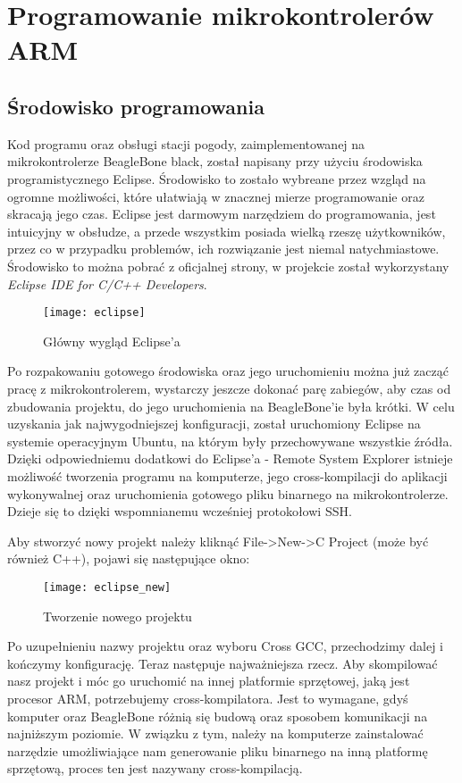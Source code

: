 \chapter{Programowanie mikrokontrolerów ARM}

\section{Środowisko programowania}
Kod programu oraz obsługi stacji pogody, zaimplementowanej na mikrokontrolerze BeagleBone black, został napisany przy użyciu środowiska programistycznego Eclipse. Środowisko to zostało wybreane przez wzgląd na ogromne możliwości, które ułatwiają w znacznej mierze programowanie oraz skracają jego czas. Eclipse jest darmowym narzędziem do programowania, jest intuicyjny w obsłudze, a przede wszystkim posiada wielką rzeszę użytkowników, przez co w przypadku problemów, ich rozwiązanie jest niemal natychmiastowe. Środowisko to można pobrać z oficjalnej strony, w projekcie został wykorzystany \emph{Eclipse IDE for C/C++ Developers}.

\begin{figure}[h]
\centering
\texttt{[image: eclipse]}
\caption{Główny wygląd Eclipse'a}
\label{fig:eclipse}
\end{figure}

Po rozpakowaniu gotowego środowiska oraz jego uruchomieniu można już zacząć pracę z mikrokontrolerem, wystarczy jeszcze dokonać parę zabiegów, aby czas od zbudowania projektu, do jego uruchomienia na BeagleBone'ie była krótki. W celu uzyskania jak najwygodniejszej konfiguracji, został uruchomiony Eclipse na systemie operacyjnym Ubuntu, na którym były przechowywane wszystkie źródła. Dzięki odpowiedniemu dodatkowi do Eclipse'a - Remote System Explorer istnieje możliwość tworzenia programu na komputerze, jego cross-kompilacji do aplikacji wykonywalnej oraz uruchomienia gotowego pliku binarnego na mikrokontrolerze. Dzieje się to dzięki wspomnianemu wcześniej protokołowi SSH.

Aby stworzyć nowy projekt należy kliknąć File->New->C Project (może być również C++), pojawi się następujące okno:

\begin{figure}[h]
\centering
\texttt{[image: eclipse\_new]}
\caption{Tworzenie nowego projektu}
\label{fig:eclipse_new}
\end{figure}

Po uzupełnieniu nazwy projektu oraz wyboru Cross GCC, przechodzimy dalej i kończymy konfigurację. Teraz następuje najważniejsza rzecz. Aby skompilować nasz projekt i móc go uruchomić na innej platformie sprzętowej, jaką jest procesor ARM, potrzebujemy cross-kompilatora. Jest to wymagane, gdyś komputer oraz BeagleBone różnią się budową oraz sposobem komunikacji na najniższym poziomie. W związku z tym, należy na komputerze zainstalować narzędzie umożliwiające nam generowanie pliku binarnego na inną platformę sprzętową, proces ten jest nazywany cross-kompilacją.

